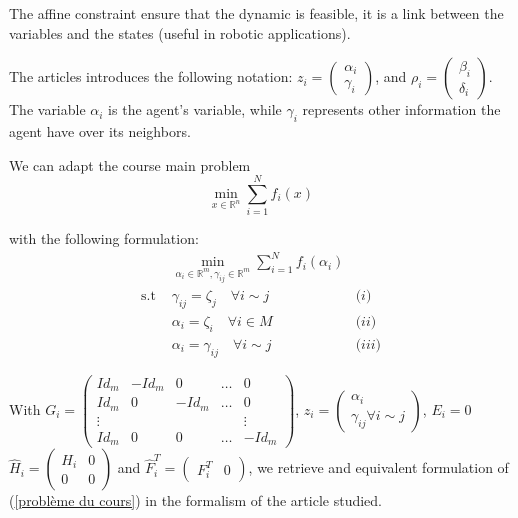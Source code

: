 \documentclass[10pt,english]{article}
\begin{document}
The affine constraint ensure that the dynamic is feasible, it is a link between the variables and the states (useful in robotic applications).

The articles introduces the following notation: $z_i=\begin{pmatrix}
\alpha_i\\
\gamma_i
\end{pmatrix}$, and $\rho_i=\begin{pmatrix}
\beta_i\\
\delta_i
\end{pmatrix}$. The variable $\alpha_i$ is the agent's variable, while $\gamma_i$ represents other information the agent have over its neighbors. 

We can adapt the course main problem
\begin{equation}\label{problème du cours}
    \min_{x\in \mathbb R^n} \sum_{i=1}^N f_i(x)
\end{equation}

with the following formulation: 
\begin{equation}\label{main problem}
    \begin{aligned}
    &\min_{\alpha_i\in\mathbb{R}^{m}, \gamma_{ij}\in\mathbb{R}^{m}} \sum_{i=1}^{N} f_i(\alpha_i)\\
    \text{s.t } & \gamma_{ij}=\zeta_{j} \quad \forall i\sim j & \textit{(i)}\\ 
    & \alpha_i=\zeta_i \quad \forall i \in M & \textit{(ii)}\\
    & \alpha_i=\gamma_{ij} \quad \forall i\sim j & \textit{(iii)}
    \end{aligned}
\end{equation}

With $G_i=\begin{pmatrix}
Id_m & -Id_m & 0 & \hdots &0 \\
Id_m & 0 &-Id_m &\hdots &0 \\
\vdots & & & & \vdots \\
Id_m & 0 & 0 & \hdots & -Id_m
\end{pmatrix}$, $z_i=\begin{pmatrix}
\alpha_i \\
\gamma_{ij} \forall i\sim j
\end{pmatrix}$, $E_i=0$
$\hat H_i= \begin{pmatrix}
H_i & 0 \\
0 & 0 
\end{pmatrix}$ and $\hat F_i^T= \begin{pmatrix}
F_i^T & 0
\end{pmatrix}$, we retrieve and equivalent formulation of (\ref{problème du cours}) in the formalism of the article studied.
\end{document}
